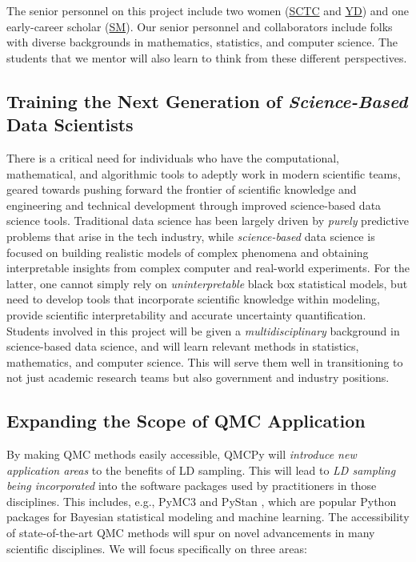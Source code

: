 \documentclass[11pt]{NSFamsart}
\newcommand{\cmtS}[1]{{\color{blue}{(Simon: #1)}}}
\newcommand{\SM}{\hyperlink{SMlink}{SM}\xspace}
\newcommand{\SCTC}{\hyperlink{SCTClink}{SCTC}\xspace}
\newcommand{\YD}{\hyperlink{YDlink}{YD}\xspace}
\begin{document}
The senior personnel on this project include two women (\SCTC and \YD) and one early-career scholar (\SM).  Our senior personnel and collaborators include folks with diverse backgrounds in mathematics, statistics, and computer science.  The students  that we mentor will also learn to think from these different perspectives.

\cmtS{Further emphasis on multi-disciplinary education for the sciences? Some sample writing below}


\subsection*{Training the Next Generation of {\em Science-Based} Data Scientists}

There is a critical need for individuals who have the computational, mathematical, and algorithmic tools to adeptly work in modern scientific teams, geared towards pushing forward the frontier of scientific knowledge and engineering and technical development through improved science-based data science tools.  Traditional data science has been largely driven by \textit{purely} predictive problems that arise in the tech industry, while \textit{science-based} data science is focused on building realistic models of complex phenomena and obtaining interpretable insights from complex computer and real-world experiments. For the latter, one cannot simply rely on \textit{uninterpretable} black box statistical models, but need to develop tools that incorporate scientific knowledge within modeling, provide scientific interpretability and accurate uncertainty quantification.  Students involved in this project will be given a \textit{multidisciplinary} background in science-based data science, and will learn relevant methods in statistics, mathematics, and computer science.  This will serve them well in transitioning to not just academic research teams but also government and industry positions.



\subsection{Expanding the Scope of QMC Application} \label{sec:scopeapplication} \cmtS{will revise, make more focused on specific scientific applications} By making QMC methods easily accessible, QMCPy will \emph{introduce new application areas} to the benefits of LD sampling.  This will lead to \emph{LD sampling being incorporated} into the software packages used by practitioners in those disciplines. This includes, e.g., PyMC3 \citep{salvatier2016probabilistic} and PyStan \citep{stan2017pystan}, which are popular Python packages for Bayesian statistical modeling and machine learning. The accessibility of state-of-the-art QMC methods will spur on novel advancements in many scientific disciplines. We will focus specifically on three areas:
\end{document}
